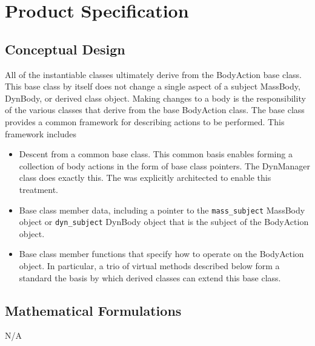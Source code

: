 %

\chapter{Product Specification}\label{ch:\modelpartid:spec}

\section{Conceptual Design}
All of the instantiable \ModelDesc classes ultimately derive from the BodyAction
base class. This base class by itself does not change a single aspect of
a subject MassBody, DynBody, or derived class object. Making changes to a body is the
responsibility of the various classes that derive from the base BodyAction
class. The base class provides a common framework for describing actions to be
performed. This framework includes
\begin{itemize}
\item Descent from a common base class. This common basis enables forming a
collection of body actions in the form of base class pointers. The DynManager
class does exactly this. The \ModelDesc was explicitly architected to enable
this treatment.
\item Base class member data, including a pointer to the {\tt mass\_subject} MassBody object or
{\tt dyn\_subject} DynBody object that is the subject of the BodyAction object.
\item Base class member functions that specify how to operate on the BodyAction
object. In particular, a trio of virtual methods described below
form a standard the basis by which derived classes can extend this base class.
\end{itemize}

\section{Mathematical Formulations}
N/A
